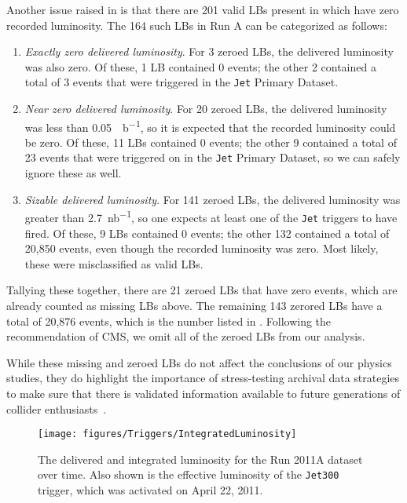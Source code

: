 \documentclass[aps,prd,twocolumn,preprintnumbers,nofootinbib,longbibliography,floatfix,superscriptaddress]{revtex4-1}
\begin{document}
Another issue raised in  is that there are 201 valid LBs present in  which have zero recorded luminosity.
%
The 164 such LBs in Run A can be categorized as follows:
%
\begin{enumerate}
%
\item \textit{Exactly zero delivered luminosity}.  For 3 zeroed LBs, the delivered luminosity was also zero. Of these, 1 LB contained 0 events; the other 2 contained a total of 3 events that were triggered in the \texttt{Jet} Primary Dataset.
%
\item \textit{Near zero delivered luminosity}.  For 20 zeroed LBs, the delivered luminosity was less than \SI{0.05}{\mu b^{-1}}, so it is expected that the recorded luminosity could be zero.  Of these, 11 LBs contained 0 events; the other 9 contained a total of 23 events that were triggered on in the \texttt{Jet} Primary Dataset, so we can safely ignore these as well.
%
\item \textit{Sizable delivered luminosity}.  For 141 zeroed LBs, the delivered luminosity was greater than \SI{2.7}{nb^{-1}}, so one expects at least one of the \texttt{Jet} triggers to have fired.  Of these, 9 LBs contained 0 events; the other 132 contained a total of 20,850 events, even though the recorded luminosity was zero.  Most likely, these were misclassified as valid LBs.
%
\end{enumerate}
%
Tallying these together, there are 21 zeroed LBs that have zero events, which are already counted as missing LBs above.
%
The remaining 143 zerored LBs have a total of 20,876 events, which is the number listed in .
%
Following the recommendation of CMS, we omit all of the zeroed LBs from our analysis.


While these missing and zeroed LBs do not affect the conclusions of our physics studies, they do highlight the importance of stress-testing archival data strategies to make sure that there is validated information available to future generations of collider enthusiasts~\cite{strassler2019slow}.


\begin{figure}[t]
  \centering
    \texttt{[image: figures/Triggers/IntegratedLuminosity]}
    \caption{The delivered and integrated luminosity for the Run 2011A dataset over time.
    Also shown is the effective luminosity of the {\tt Jet300} trigger, which was activated on April 22, 2011.}
    \label{figure:del_rec_300}
\end{figure}
\end{document}
